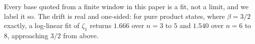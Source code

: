 Every base quoted from a finite window in this paper is a fit, not a limit, and we label it so.
The drift is real and one-sided: for pure product states, where \(\beta = 3/2\) exactly, a
log-linear fit of \(\zeta_1\) returns \(1.666\) over \(n = 3\) to \(5\) and \(1.540\) over
\(n = 6\) to \(8\), approaching \(3/2\) from above.
